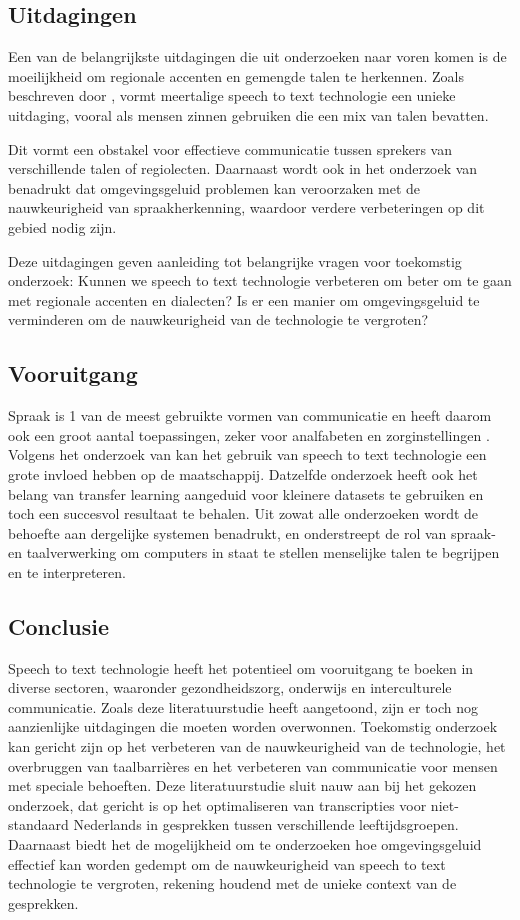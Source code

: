 \subsection{Uitdagingen}
Een van de belangrijkste uitdagingen die uit onderzoeken naar voren komen is de moeilijkheid om regionale accenten en gemengde talen te herkennen.
Zoals beschreven door \autocite{Reddy2022}, vormt meertalige speech to text technologie een unieke uitdaging, vooral als mensen zinnen gebruiken die een mix van talen bevatten.

Dit vormt een obstakel voor effectieve communicatie tussen sprekers van verschillende talen of regiolecten. Daarnaast wordt ook in het onderzoek van \autocite{ajami2016use} benadrukt dat omgevingsgeluid problemen kan veroorzaken met de nauwkeurigheid van spraakherkenning, waardoor verdere verbeteringen op dit gebied nodig zijn.

Deze uitdagingen geven aanleiding tot belangrijke vragen voor toekomstig onderzoek: Kunnen we speech to text technologie verbeteren om beter om te gaan met regionale accenten en dialecten? Is er een manier om omgevingsgeluid te verminderen om de nauwkeurigheid van de technologie te vergroten?


\subsection{Vooruitgang}
Spraak is 1 van de meest gebruikte vormen van communicatie en heeft daarom ook een groot aantal toepassingen, zeker voor analfabeten en zorginstellingen \autocite{Arun2021}. Volgens het onderzoek van \autocite{Roepke2019} kan het gebruik van speech to text technologie een grote invloed hebben op de maatschappij. Datzelfde onderzoek heeft ook het belang van transfer learning aangeduid voor kleinere datasets te gebruiken en toch een succesvol resultaat te behalen. Uit zowat alle onderzoeken wordt de behoefte aan dergelijke systemen benadrukt, en onderstreept de rol van spraak- en taalverwerking om computers in staat te stellen menselijke talen te begrijpen en te interpreteren.

\subsection{Conclusie}
Speech to text technologie heeft het potentieel om vooruitgang te boeken in diverse sectoren, waaronder gezondheidszorg, onderwijs en interculturele communicatie. Zoals deze literatuurstudie heeft aangetoond, zijn er toch nog aanzienlijke uitdagingen die moeten worden overwonnen. Toekomstig onderzoek kan gericht zijn op het verbeteren van de nauwkeurigheid van de technologie, het overbruggen van taalbarrières en het verbeteren van communicatie voor mensen met speciale behoeften.
Deze literatuurstudie sluit nauw aan bij het gekozen onderzoek, dat gericht is op het optimaliseren van transcripties voor niet-standaard Nederlands in gesprekken tussen verschillende leeftijdsgroepen. Daarnaast biedt het de mogelijkheid om te onderzoeken hoe omgevingsgeluid effectief kan worden gedempt om de nauwkeurigheid van speech to text technologie te vergroten, rekening houdend met de unieke context van de gesprekken.

